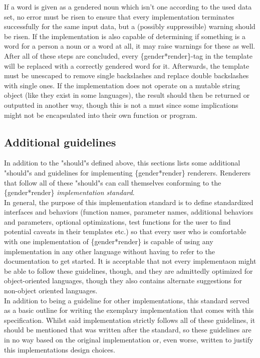 \documentclass{article}
\begin{document}
    If a word is given as a gendered noun which isn't one according to the used data set, no error must be risen to ensure that every implementation terminates successfully for the same input data, but a (possibly suppressible) warning should be risen.
    If the implementation is also capable of determining if something is a word for a person a noun or a word at all, it may raise warnings for these as well.\\

    After all of these steps are concluded, every \{gender*render\}-tag in the template will be replaced with a correctly gendered word for it.
    Afterwards, the template must be unescaped to remove single backslashes and replace double backslashes with single ones.
    If the implementation does not operate on a mutable string object (like they exist in some languages), the result should then be returned or outputted in another way, though this is not a must since some implications might not be encapsulated into their own function or program.\\

    \subsection{Additional guidelines}

    In addition  to the "should"s defined above, this sections lists some additional "should"s and guidelines for implementing \{gender*render\} renderers.
    Renderers that follow all of these "should"s can call themselves conforming to the \{gender*render\} \emph{implementation standard}.\\

    In general, the purpose of this implementation standard is to define standardized interfaces and behaviors (function names, parameter names, additional behaviors and parameters, optional optimizations, test functions for the user to find potential caveats in their templates etc.) so that every user who is comfortable with one implementation of \{gender*render\} is capable of using any implementation in any other language without having to refer to the documentation to get started.
    It is acceptable that not every implementaon might be able to follow these guidelines, though, and they are admittedly optimized for object-oriented languages, though they also contains alternate suggestions for non-object oriented languages.\\

    In addition to being a guideline for other implementations, this standard served as a basic outline for writing the exemplary implementation that comes with this specification.
    Whilst said implementation strictly follows all of these guidelines, it should be mentioned that was written after the standard, so these guidelines are in no way based on the original implementation or, even worse, written to justify this implementations design choices.\\
\end{document}
